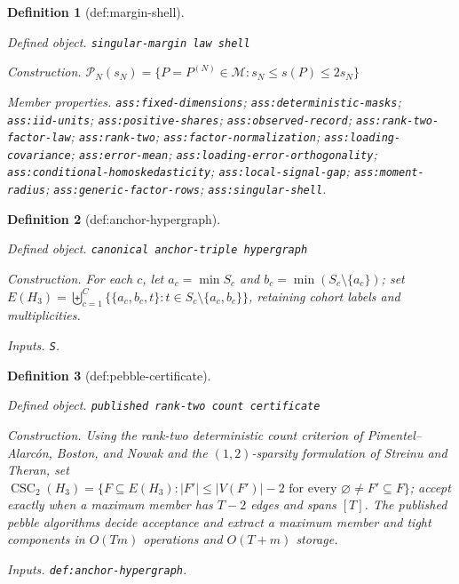 \documentclass{article}
\newtheorem{definition}{Definition}
\begin{document}
\begin{definition}[def:margin-shell]\label{def:margin-shell}
\par\smallskip\noindent\emph{Defined object.} \texttt{singular-\allowbreak{}margin law shell}
\par\smallskip\noindent\emph{Construction.} \(\mathcal P_N(s_N)=\{P=P^{(N)}\in\mathcal M:s_N\le s(P)\le2s_N\}\)
\par\smallskip\noindent\emph{Member properties.} \texttt{ass:\allowbreak{}fixed-\allowbreak{}dimensions}; \texttt{ass:\allowbreak{}deterministic-\allowbreak{}masks}; \texttt{ass:\allowbreak{}iid-\allowbreak{}units}; \texttt{ass:\allowbreak{}positive-\allowbreak{}shares}; \texttt{ass:\allowbreak{}observed-\allowbreak{}record}; \texttt{ass:\allowbreak{}rank-\allowbreak{}two-\allowbreak{}factor-\allowbreak{}law}; \texttt{ass:\allowbreak{}rank-\allowbreak{}two}; \texttt{ass:\allowbreak{}factor-\allowbreak{}normalization}; \texttt{ass:\allowbreak{}loading-\allowbreak{}covariance}; \texttt{ass:\allowbreak{}error-\allowbreak{}mean}; \texttt{ass:\allowbreak{}loading-\allowbreak{}error-\allowbreak{}orthogonality}; \texttt{ass:\allowbreak{}conditional-\allowbreak{}homoskedasticity}; \texttt{ass:\allowbreak{}local-\allowbreak{}signal-\allowbreak{}gap}; \texttt{ass:\allowbreak{}moment-\allowbreak{}radius}; \texttt{ass:\allowbreak{}generic-\allowbreak{}factor-\allowbreak{}rows}; \texttt{ass:\allowbreak{}singular-\allowbreak{}shell}.
\end{definition}

\begin{definition}[def:anchor-hypergraph]\label{def:anchor-hypergraph}
\par\smallskip\noindent\emph{Defined object.} \texttt{canonical anchor-\allowbreak{}triple hypergraph}
\par\smallskip\noindent\emph{Construction.} For each \(c\), let \(a_c=\min S_c\) and \(b_c=\min(S_c\setminus\{a_c\})\); set \(E(H_3)=\biguplus_{c=1}^C\{\{a_c,b_c,t\}:t\in S_c\setminus\{a_c,b_c\}\}\), retaining cohort labels and multiplicities.
\par\smallskip\noindent\emph{Inputs.} \texttt{S}.
\end{definition}

\begin{definition}[def:pebble-certificate]\label{def:pebble-certificate}
\par\smallskip\noindent\emph{Defined object.} \texttt{published rank-\allowbreak{}two count certificate}
\par\smallskip\noindent\emph{Construction.} Using the rank-two deterministic count criterion of Pimentel--Alarcón, Boston, and Nowak and the \( (1,2)\)-sparsity formulation of Streinu and Theran, set \(\operatorname{CSC}_2(H_3)=\{F\subseteq E(H_3):|F'|\le|V(F')|-2\text{ for every }\varnothing\ne F'\subseteq F\}\); accept exactly when a maximum member has \(T-2\) edges and spans \([T]\). The published pebble algorithms decide acceptance and extract a maximum member and tight components in \(O(Tm)\) operations and \(O(T+m)\) storage.
\par\smallskip\noindent\emph{Inputs.} \texttt{def:\allowbreak{}anchor-\allowbreak{}hypergraph}.
\end{definition}
\end{document}
